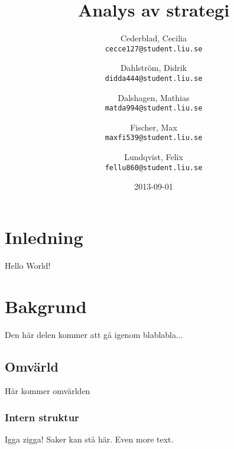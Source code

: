 \documentclass{article}
\title{Analys av strategi}
\date{2013-09-01}
\author{
  Cederblad, Cecilia\\
  \texttt{cecce127@student.liu.se}
  \and
  Dahlström, Didrik\\
  \texttt{didda444@student.liu.se}
  \and
  Dalshagen, Mathias\\
  \texttt{matda994@student.liu.se}
  \and
  Fischer, Max\\
  \texttt{maxfi539@student.liu.se}
  \and
  Lundqvist, Felix\\
  \texttt{fellu860@student.liu.se}
}
\begin{document}
  \maketitle
  \newpage

 \section{Inledning}

Hello World!

\section{Bakgrund}

Den här delen kommer att gå igenom blablabla...

\subsection{Omvärld}

Här kommer omvärlden

\subsubsection{Intern struktur}

Igga zigga! Saker kan stå här. Even more text.
\end{document}
